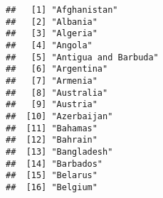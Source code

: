 \documentclass[
]{article}
\begin{document}
\begin{verbatim}
##   [1] "Afghanistan"                                                                                                                                          
##   [2] "Albania"                                                                                                                                              
##   [3] "Algeria"                                                                                                                                              
##   [4] "Angola"                                                                                                                                               
##   [5] "Antigua and Barbuda"                                                                                                                                  
##   [6] "Argentina"                                                                                                                                            
##   [7] "Armenia"                                                                                                                                              
##   [8] "Australia"                                                                                                                                            
##   [9] "Austria"                                                                                                                                              
##  [10] "Azerbaijan"                                                                                                                                           
##  [11] "Bahamas"                                                                                                                                              
##  [12] "Bahrain"                                                                                                                                              
##  [13] "Bangladesh"                                                                                                                                           
##  [14] "Barbados"                                                                                                                                             
##  [15] "Belarus"                                                                                                                                              
##  [16] "Belgium"                                                                                                                                              

\end{verbatim}
\end{document}
